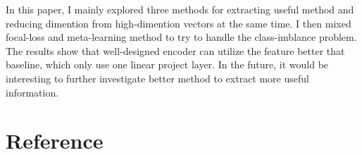 \documentclass{article}%
\begin{document}
%
In this paper, I mainly explored three methods for extracting useful method and reducing dimention from high{-}dimention vectors at the same time. I then mixed focal{-}loss and meta{-}learning method to try to handle the class{-}imblance problem. The results show that well{-}designed encoder can utilize the feature better that baseline, which only use one linear project layer. In the future, it would be interesting to further investigate better method to extract more useful information.%

%
\section{Reference}%

%

%
\end{document}
